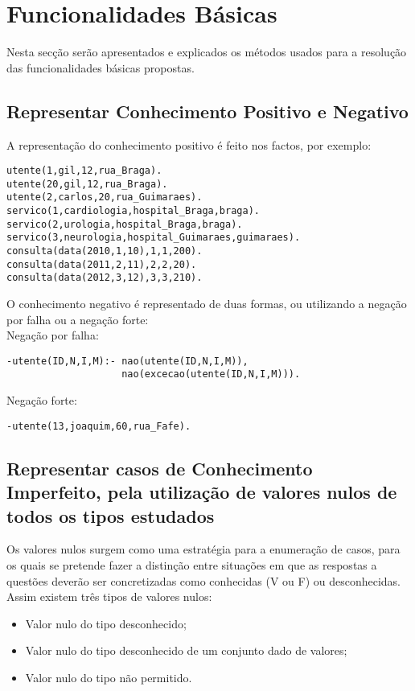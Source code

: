 \section{Funcionalidades Básicas}
\label{p3:funcbasic}
Nesta secção serão apresentados e explicados os métodos usados para a resolução das funcionalidades básicas propostas.

\subsection{Representar Conhecimento Positivo e Negativo}

A representação do conhecimento positivo é feito nos factos, por exemplo:

\begin{verbatim}
utente(1,gil,12,rua_Braga).
utente(20,gil,12,rua_Braga).
utente(2,carlos,20,rua_Guimaraes).
servico(1,cardiologia,hospital_Braga,braga).
servico(2,urologia,hospital_Braga,braga).
servico(3,neurologia,hospital_Guimaraes,guimaraes). 
consulta(data(2010,1,10),1,1,200).
consulta(data(2011,2,11),2,2,20).
consulta(data(2012,3,12),3,3,210).
\end{verbatim}

O conhecimento negativo é representado de duas formas, ou utilizando a negação por falha ou a negação forte: \\


Negação por falha: 
\begin{verbatim}
-utente(ID,N,I,M):- nao(utente(ID,N,I,M)),
					nao(excecao(utente(ID,N,I,M))).
\end{verbatim}

Negação forte: 
\begin{verbatim}
-utente(13,joaquim,60,rua_Fafe). 
\end{verbatim}



\subsection{Representar casos de Conhecimento Imperfeito, pela utilização de valores nulos de todos os tipos estudados}

Os valores nulos surgem como uma estratégia para a enumeração de casos, para os quais se pretende fazer a distinção entre situações em que as respostas a questões deverão ser concretizadas como conhecidas (V ou F) ou desconhecidas. 
Assim existem três tipos de valores nulos:

\begin{itemize}
	\item Valor nulo do tipo desconhecido;	
	\item Valor nulo do tipo desconhecido de um conjunto dado de valores;
	\item Valor nulo do tipo não permitido. 
\end{itemize}

